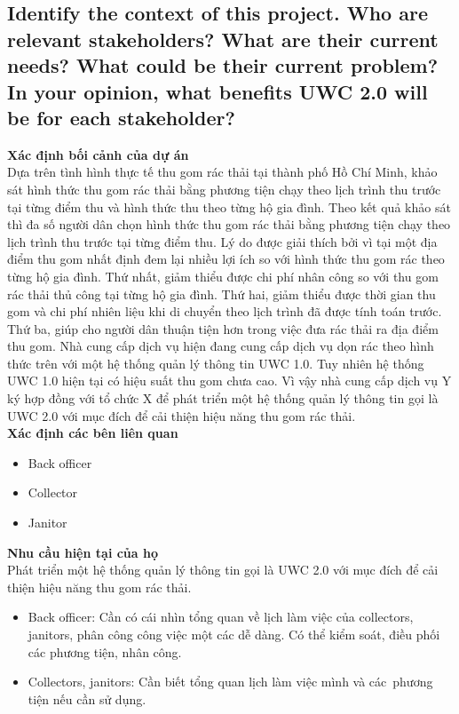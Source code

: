 \documentclass[a4paper]{article}
\begin{document}
\subsection{Identify the context of this project. Who are relevant stakeholders? What are their current needs? What could be their current problem? In your opinion, what benefits UWC 2.0 will be for each stakeholder?}
\setlength{\parindent}{0cm}
\textbf{Xác định bối cảnh của dự án}\\ 
Dựa trên tình hình thực tế thu gom rác thải tại thành phố Hồ Chí Minh, khảo sát hình thức thu gom rác thải bằng phương tiện chạy theo lịch trình thu trước tại từng điểm thu và hình thức thu theo từng hộ gia đình. Theo kết quả khảo sát thì đa số người dân chọn hình thức  thu gom
rác thải bằng phương tiện chạy theo lịch trình thu trước tại từng điểm thu. Lý do được giải thích bởi vì tại một địa điểm thu gom nhất định đem lại nhiều lợi ích so với hình thức thu gom rác theo từng hộ gia đình. Thứ nhất, giảm thiểu được chi phí nhân công so với thu gom rác thải thủ công tại từng hộ gia đình. Thứ hai, giảm thiểu được thời gian thu gom và chi phí nhiên liệu khi di chuyển theo lịch trình đã được tính toán trước. Thứ ba, giúp cho người dân thuận tiện hơn trong việc đưa rác thải ra địa điểm thu gom.  Nhà cung cấp dịch vụ hiện đang cung cấp dịch vụ dọn rác theo hình thức trên với một hệ thống quản lý thông tin UWC 1.0. Tuy nhiên hệ thống UWC 1.0 hiện tại có hiệu suất thu gom chưa cao. Vì vậy nhà cung cấp dịch vụ Y ký hợp đồng với tổ chức X để phát triển một hệ thống quản lý thông tin gọi là UWC 2.0 với mục đích để cải thiện hiệu năng thu gom rác thải. \\
\textbf{Xác định các bên liên quan} 
\begin{itemize}
    \item Back officer 
    \item Collector 
    \item Janitor 
\end{itemize}
\textbf{Nhu cầu hiện tại của họ}\\ Phát triển một hệ thống quản lý thông tin gọi là UWC 2.0 với mục đích để cải thiện hiệu năng thu gom rác thải. 
\begin{itemize}
    \item Back officer: Cần có cái nhìn tổng quan về lịch làm việc của collectors, janitors, phân công công việc một các dễ dàng. Có thể kiểm soát, điều phối các phương tiện, nhân công. 
    \item Collectors, janitors: Cần biết tổng quan lịch làm việc mình và các phương tiện nếu cần sử dụng.  

\end{itemize}
\end{document}
